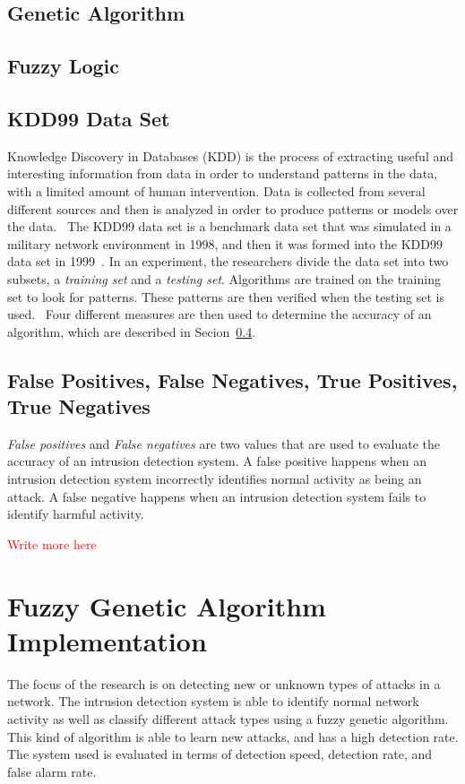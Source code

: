 \documentclass{sig-alternate}
\newcommand{\mycomment}[1]{\textcolor{red}{#1}}
\begin{document}
\subsection{Genetic Algorithm}

\subsection{Fuzzy Logic}


\subsection{KDD99 Data Set}
Knowledge Discovery in Databases (KDD) is the process of extracting useful and interesting information from data in order to understand patterns in the data, with a limited amount of human intervention. Data is collected from several different sources and then is analyzed in order to produce patterns or models over the data.~\cite{bc1_ecindm} The KDD99 data set is a benchmark data set that was simulated in a military network environment in 1998, and then it was formed into the KDD99 data set in 1999~\cite{6559603}. In an experiment, the researchers divide the data set into two subsets, a \emph{training set} and a \emph{testing set}. Algorithms are trained on the training set to look for patterns. These patterns are then verified when the testing set is used.~\cite{bc1_ecindm} Four different measures are then used to determine the accuracy of an algorithm, which are described in Secion~\ref{sec:PosNeg}.




\subsection{False Positives, False Negatives, True Positives, True Negatives}
\label{sec:PosNeg}
\emph{False positives} and \emph{False negatives} are two values that are used to evaluate the accuracy of an intrusion detection system. A false positive happens when an intrusion detection system incorrectly identifies normal activity as being an attack. A false negative happens when an intrusion detection system fails to identify harmful activity.~\cite{Liao201316}

\mycomment{Write more here}




\section{Fuzzy Genetic Algorithm Implementation}
The focus of the research is on detecting new or unknown types of attacks in a network. The intrusion detection system is able to identify normal network activity as well as classify different attack types using a fuzzy genetic algorithm. This kind of algorithm is able to learn new attacks, and has a high detection rate. The system used is evaluated in terms of detection speed, detection rate, and false alarm rate.~\cite{6496342, 6559603}
\end{document}
